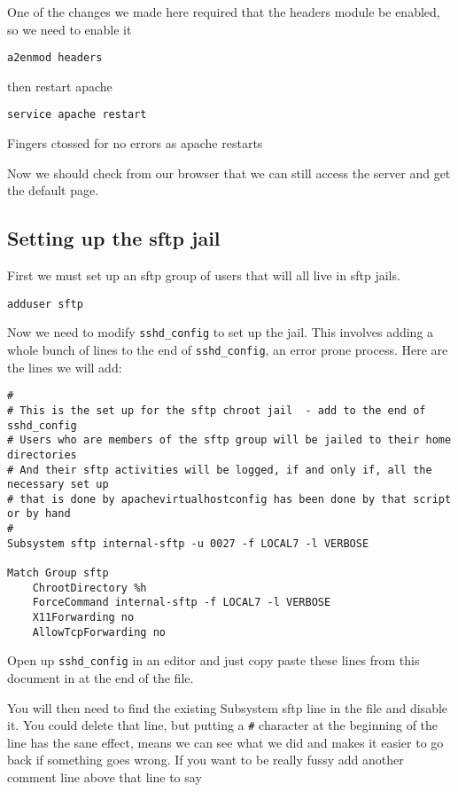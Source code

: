 \documentclass[12pt, a4paper]{article}
\begin{document}
One of the changes we made here required that the headers module be enabled, so we need to enable it

\begin{verbatim}
a2enmod headers
\end{verbatim}

then restart apache

\begin{verbatim}
service apache restart
\end{verbatim}

Fingers ctossed for no errors as apache restarts

Now we should check from our browser that we can still access the server and get the default page.

\subsection*{Setting up the sftp jail}

First we must set up an sftp group of users that will all live in sftp jails.
\begin{verbatim}
adduser sftp
\end{verbatim}

Now we need to modify \verb|sshd_config| to set up the jail. This involves adding a whole bunch of lines to the end of \verb|sshd_config|, an error prone process.
Here are the lines we will add:

\begin{verbatim}
# 
# This is the set up for the sftp chroot jail  - add to the end of sshd_config 
# Users who are members of the sftp group will be jailed to their home directories 
# And their sftp activities will be logged, if and only if, all the necessary set up 
# that is done by apachevirtualhostconfig has been done by that script or by hand 
# 
Subsystem sftp internal-sftp -u 0027 -f LOCAL7 -l VERBOSE 

Match Group sftp 
    ChrootDirectory %h 
    ForceCommand internal-sftp -f LOCAL7 -l VERBOSE 
    X11Forwarding no 
    AllowTcpForwarding no
\end{verbatim}

Open up \verb|sshd_config| in an editor and just copy paste these lines from this document in at the end of the file.

You will then need to find the existing Subsystem sftp line in the file and disable it. You could delete that line, but putting a \verb|#| character at the beginning of the line has the sane effect, means we can  see what we did and makes it easier to go back if something goes wrong. If you want to be really fussy add another comment line above that line to say
\end{document}
